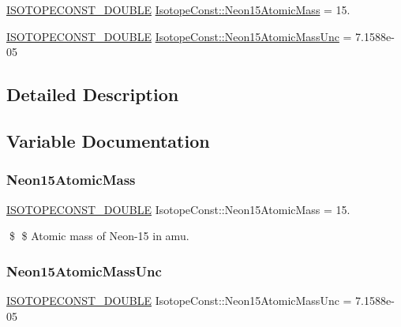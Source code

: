 \begin{DoxyCompactItemize}
\item 
\mbox{\hyperlink{group___isotope_const-_macros_ga8f45a7272ce02c0b4c65c44636ed719a}{I\+S\+O\+T\+O\+P\+E\+C\+O\+N\+S\+T\+\_\+\+D\+O\+U\+B\+LE}} \mbox{\hyperlink{group___isotope_const-_neon-_ne15_ga146cecbb208b43e53390fb72efca16b3}{Isotope\+Const\+::\+Neon15\+Atomic\+Mass}} = 15.
\item 
\mbox{\hyperlink{group___isotope_const-_macros_ga8f45a7272ce02c0b4c65c44636ed719a}{I\+S\+O\+T\+O\+P\+E\+C\+O\+N\+S\+T\+\_\+\+D\+O\+U\+B\+LE}} \mbox{\hyperlink{group___isotope_const-_neon-_ne15_ga9ae3a000935ddd496688140b96545fe0}{Isotope\+Const\+::\+Neon15\+Atomic\+Mass\+Unc}} = 7.\+1588e-\/05
\end{DoxyCompactItemize}


\subsection{Detailed Description}


\subsection{Variable Documentation}
\mbox{\label{group___isotope_const-_neon-_ne15_ga146cecbb208b43e53390fb72efca16b3}} 
\subsubsection{\texorpdfstring{Neon15\+Atomic\+Mass}{Neon15AtomicMass}}
{\footnotesize\ttfamily \mbox{\hyperlink{group___isotope_const-_macros_ga8f45a7272ce02c0b4c65c44636ed719a}{I\+S\+O\+T\+O\+P\+E\+C\+O\+N\+S\+T\+\_\+\+D\+O\+U\+B\+LE}} Isotope\+Const\+::\+Neon15\+Atomic\+Mass = 15.}

\$ \$ Atomic mass of Neon-\/15 in amu. \mbox{\label{group___isotope_const-_neon-_ne15_ga9ae3a000935ddd496688140b96545fe0}} 
\subsubsection{\texorpdfstring{Neon15\+Atomic\+Mass\+Unc}{Neon15AtomicMassUnc}}
{\footnotesize\ttfamily \mbox{\hyperlink{group___isotope_const-_macros_ga8f45a7272ce02c0b4c65c44636ed719a}{I\+S\+O\+T\+O\+P\+E\+C\+O\+N\+S\+T\+\_\+\+D\+O\+U\+B\+LE}} Isotope\+Const\+::\+Neon15\+Atomic\+Mass\+Unc = 7.\+1588e-\/05}

